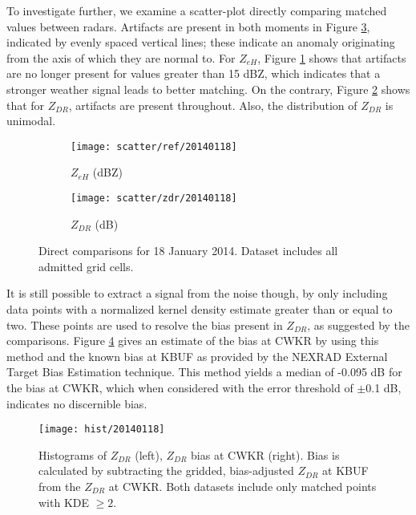 To investigate further, we examine a scatter-plot directly comparing matched values between radars.
Artifacts are present in both moments in Figure
\ref{fig:scatter_20140118}, indicated by evenly spaced vertical lines; these indicate an anomaly
originating from the axis of which they are normal to. For
$Z_{eH}$, Figure \ref{fig:scatter_ref_20140118} shows that artifacts are no longer present for values
greater than 15 dBZ, which indicates that a
stronger weather signal leads to better matching. On the contrary, Figure \ref{fig:scatter_zdr_20140118}
shows that for $Z_{DR}$, artifacts are present throughout. Also, the distribution of $Z_{DR}$ is unimodal. 

\begin{figure}[H]
\centering
   \begin{subfigure}{0.49\linewidth} \centering
     \texttt{[image: scatter/ref/20140118]}
     \caption{$Z_{eH}$ (dBZ)}\label{fig:scatter_ref_20140118}
   \end{subfigure}
   \begin{subfigure}{0.49\linewidth} \centering
     \texttt{[image: scatter/zdr/20140118]}
     \caption{$Z_{DR}$ (dB)}\label{fig:scatter_zdr_20140118}
   \end{subfigure}
\caption{Direct comparisons for 18 January 2014. Dataset includes all admitted grid cells.} \label{fig:scatter_20140118}
\end{figure}

It is still possible to extract a signal from the noise though, by only including data points with a
normalized kernel density estimate greater than or equal to two. These points are used to resolve the bias present in
$Z_{DR}$, as suggested by the comparisons. Figure \ref{fig:hist_20140118} gives an estimate of the
bias at CWKR by using this method and the known bias at KBUF as provided by the NEXRAD
External Target Bias Estimation technique. This method yields a median of -0.095 dB for the bias at CWKR, which when
considered with the error threshold of $\pm$0.1 dB, indicates no discernible bias.

\begin{figure}[H]
\texttt{[image: hist/20140118]}\centering
\caption{Histograms of $Z_{DR}$ (left), $Z_{DR}$ bias at CWKR (right). Bias is calculated by subtracting the gridded, bias-adjusted $Z_{DR}$ at KBUF from the
$Z_{DR}$ at CWKR. Both datasets include only matched points with KDE $\geq 2$. } 
\label{fig:hist_20140118}
\end{figure}



